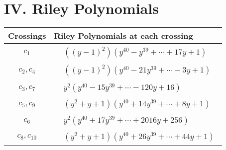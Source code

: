 \documentclass[1p]{elsarticle_modified}
\theoremstyle{definition}
\begin{document}
\centering \section*{ IV. Riley Polynomials}
\begin{tabular}{m{50pt}|m{274pt}}
Crossings & \hspace{64pt}Riley Polynomials at each crossing \\
\hline $$\begin{aligned}c_{1}\end{aligned}$$&$\begin{aligned}
&((y-1)^2)(y^{40}- y^{39}+\cdots+17 y+1)
\end{aligned}$\\
\hline $$\begin{aligned}c_{2},c_{4}\end{aligned}$$&$\begin{aligned}
&((y-1)^2)(y^{40}-21 y^{39}+\cdots-3 y+1)
\end{aligned}$\\
\hline $$\begin{aligned}c_{3},c_{7}\end{aligned}$$&$\begin{aligned}
&y^2(y^{40}-15 y^{39}+\cdots-120 y+16)
\end{aligned}$\\
\hline $$\begin{aligned}c_{5},c_{9}\end{aligned}$$&$\begin{aligned}
&(y^2+y+1)(y^{40}+14 y^{39}+\cdots+8 y+1)
\end{aligned}$\\
\hline $$\begin{aligned}c_{6}\end{aligned}$$&$\begin{aligned}
&y^2(y^{40}+17 y^{39}+\cdots+2016 y+256)
\end{aligned}$\\
\hline $$\begin{aligned}c_{8},c_{10}\end{aligned}$$&$\begin{aligned}
&(y^2+y+1)(y^{40}+26 y^{39}+\cdots+44 y+1)
\end{aligned}$\\
\hline
\end{tabular}
\vskip 2pc
\end{document}
